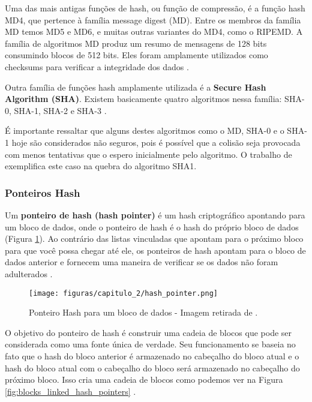         Uma das mais antigas funções de hash, ou função de compressão, é a função hash MD4, que pertence à família message digest (MD). Entre os membros da família MD temos MD5 e MD6, e muitas outras variantes do MD4, como o RIPEMD. A família de algoritmos MD produz um resumo de mensagens de 128 bits consumindo blocos de 512 bits. Eles foram amplamente utilizados como checksums para verificar a integridade dos dados \cite{beginnig_blockchain_bikramaditya}.
        
        Outra família de funções hash amplamente utilizada é a \textbf{Secure Hash Algorithm (SHA)}. Existem basicamente quatro algoritmos nessa família: SHA-0, SHA-1, SHA-2 e SHA-3 \cite{beginnig_blockchain_bikramaditya}.

	É importante ressaltar que alguns destes algoritmos como o MD, SHA-0 e o SHA-1 hoje são considerados não seguros, pois é possível que a colisão seja provocada com menos tentativas que o espero inicialmente pelo algoritmo. O trabalho de \citeauthor{collision_sha1} exemplifica este caso na quebra do algoritmo SHA1.
    
        \subsubsection{Ponteiros Hash}
        
            Um \textbf{ponteiro de hash (hash pointer)} é um hash criptográfico apontando para um bloco de dados, onde o ponteiro de hash é o hash do próprio bloco de dados (Figura \ref{fig:hash_pointer}). Ao contrário das listas vinculadas que apontam para o próximo bloco para que você possa chegar até ele, os ponteiros de hash apontam para o bloco de dados anterior e fornecem uma maneira de verificar se os dados não foram adulterados  \cite{beginnig_blockchain_bikramaditya}.
            
                \begin{figure}[h]
                     \centering
                     \texttt{[image: figuras/capitulo\_2/hash\_pointer.png]}
                     \caption{Ponteiro Hash para um bloco de dados - Imagem retirada de \cite{beginnig_blockchain_bikramaditya}.}
                     \label{fig:hash_pointer}
                \end{figure}
            
            O objetivo do ponteiro de hash é construir uma cadeia de blocos que pode ser considerada como uma fonte única de verdade. Seu funcionamento se baseia no fato que o hash do bloco anterior é armazenado no cabeçalho do bloco atual e o hash do bloco atual com o cabeçalho do bloco será armazenado no cabeçalho do próximo bloco. Isso cria uma cadeia de blocos como podemos ver na Figura \ref{fig:blocks_linked_hash_pointers}  \cite{beginnig_blockchain_bikramaditya}.
            
